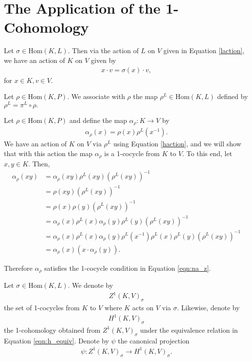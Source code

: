 \section{The Application of the 1-Cohomology}
Let $\sigma \in \mathrm{Hom}(K, L)$. Then via the action of $L$ on $V$ given in Equation \ref{laction}, we have an action of $K$ on $V$ given by
\begin{align} \label{haction} x \cdot v = \sigma(x) \cdot v, \end{align}
for $x \in K, v \in V$.

\begin{definition} Let $\rho \in \mathrm{Hom}(K, P)$. We associate with $\rho$ the map $\rho^L \in \mathrm{Hom}(K, L)$ defined by
$\rho^L = \pi^L \circ \rho.$
\end{definition}

Let $\rho \in \mathrm{Hom}(K, P)$ and define the map $\alpha_\rho: K \rightarrow V$ by
\begin{align}\label{rho:alpha}
\alpha_\rho(x) = \rho(x)\rho^L(x^{-1}).
\end{align}
We have an action of $K$ on $V$ via $\rho^L$ using Equation \ref{haction}, and we will show that with this action the map $\alpha_\rho$ is a 1-cocycle from $K$ to $V$. To this end, let $x, y \in K$.
Then,
\begin{align*} \alpha_\rho(xy) &= \alpha_\rho(xy) \rho^L(xy) \left(\rho^L(xy)\right)^{-1} \\
	&= \rho(xy) \left(\rho^L(xy)\right)^{-1} \\
	&= \rho(x) \rho(y) \left(\rho^L(xy)\right)^{-1} \\
	&= \alpha_\rho(x) \rho^L(x) \alpha_\rho(y) \rho^L(y) \left(\rho^L(xy)\right)^{-1} \\
	&= \alpha_\rho(x) \rho^L(x) \alpha_\rho(y) \rho^L(x^{-1}) \rho^L(x) \rho^L(y) \left(\rho^L(xy)\right)^{-1} \\
	&= \alpha_\rho(x) \left(x \cdot \alpha_\rho(y)\right). 
\end{align*}

Therefore $\alpha_\rho$ satisfies the 1-cocycle condition in Equation \ref{eqn:na_z}.

\begin{definition}\label{h1sigma} Let $\sigma \in \mathrm{Hom}(K, L)$. We denote by
\begin{align*} Z^1(K, V)_\sigma \end{align*}
the set of 1-cocycles from $K$ to $V$ where $K$ acts on $V$ via $\sigma$.
Likewise, denote by
\begin{align*} H^1(K, V)_\sigma \end{align*}
the 1-cohomology obtained from $Z^1(K, V)_\sigma$ under the equivalence relation in Equation \ref{eqn:h_equiv}. Denote by $\psi$ the canonical projection
\begin{align*} \psi : Z^1(K, V)_\sigma \rightarrow H^1(K, V)_\sigma. \end{align*}
\end{definition} 

